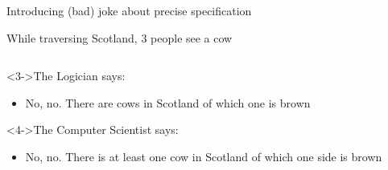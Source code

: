 \begin{frame}{Introducing (bad) joke about precise specification}
\begin{block}{While traversing Scotland, 3 people see a cow}
\begin{columns}
\begin{column}{.45\linewidth}
        \begin{block}<3->{The Logician says:}
          \begin{itemize}
          \item No, no. There are cows in Scotland of which one is brown
          \end{itemize}
        \end{block}

        \begin{block}<4->{The Computer Scientist says:}
          \begin{itemize}
          \item No, no. There is at least one cow in Scotland of which one
            side is brown
          \end{itemize}
        \end{block}
      \end{column}
    \end{columns}
  \end{block}
\end{frame}
